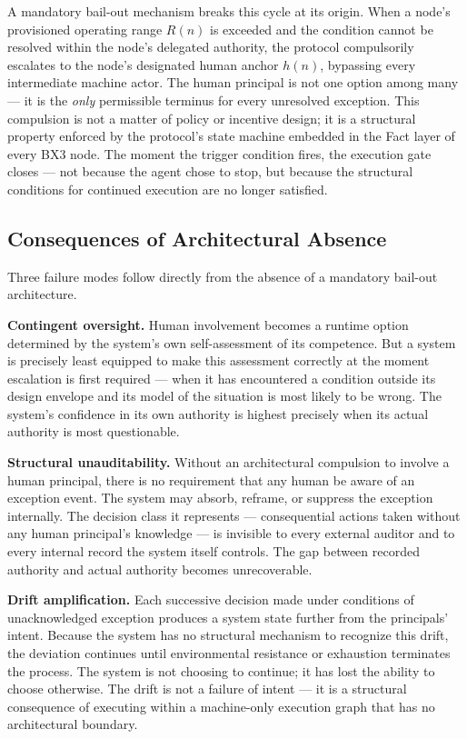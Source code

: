 \documentclass{article}
\providecommand{\bxthree}{BX3}
\providecommand{\fact}{Fact}
\begin{document}
A mandatory bail-out mechanism breaks this cycle at its origin. When a node's provisioned operating range $R(n)$ is exceeded and the condition cannot be resolved within the node's delegated authority, the protocol compulsorily escalates to the node's designated human anchor $h(n)$, bypassing every intermediate machine actor. The human principal is not one option among many — it is the \emph{only} permissible terminus for every unresolved exception. This compulsion is not a matter of policy or incentive design; it is a structural property enforced by the protocol's state machine embedded in the \fact{} layer of every \bxthree{} node. The moment the trigger condition fires, the execution gate closes — not because the agent chose to stop, but because the structural conditions for continued execution are no longer satisfied.

\subsection{Consequences of Architectural Absence}

Three failure modes follow directly from the absence of a mandatory bail-out architecture.

\textbf{Contingent oversight.} Human involvement becomes a runtime option determined by the system's own self-assessment of its competence. But a system is precisely least equipped to make this assessment correctly at the moment escalation is first required — when it has encountered a condition outside its design envelope and its model of the situation is most likely to be wrong. The system's confidence in its own authority is highest precisely when its actual authority is most questionable.

\textbf{Structural unauditability.} Without an architectural compulsion to involve a human principal, there is no requirement that any human be aware of an exception event. The system may absorb, reframe, or suppress the exception internally. The decision class it represents — consequential actions taken without any human principal's knowledge — is invisible to every external auditor and to every internal record the system itself controls. The gap between recorded authority and actual authority becomes unrecoverable.

\textbf{Drift amplification.} Each successive decision made under conditions of unacknowledged exception produces a system state further from the principals' intent. Because the system has no structural mechanism to recognize this drift, the deviation continues until environmental resistance or exhaustion terminates the process. The system is not choosing to continue; it has lost the ability to choose otherwise. The drift is not a failure of intent — it is a structural consequence of executing within a machine-only execution graph that has no architectural boundary.
\end{document}
